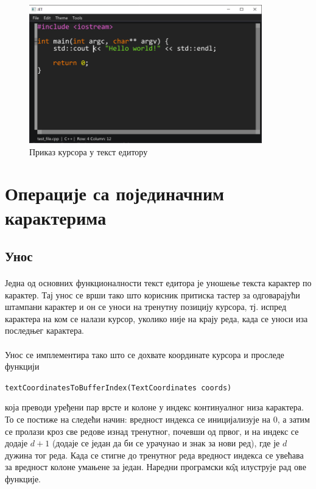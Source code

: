 \documentclass[12pt,oneside]{memoir}
\begin{document}
\begin{figure}[!ht]
	\centering
	\includegraphics[width=0.9\textwidth]{images/cursor.png}
	\caption{Приказ курсора у текст едитору}
	\label{fig:cursor}
\end{figure}

\section{Операције са појединачним карактерима}

\subsection{Унос}
\paragraph{}
Једна од основних функционалности текст едитора је уношење текста карактер
по карактер. Тај унос се врши тако што корисник притиска тастер за одговарајући
штампани карактер и он се уноси на тренутну позицију курсора, тј. испред карактера на ком се налази курсор, уколико није на крају реда, када се уноси иза последњег карактера. 

\paragraph{}
Унос се имплементира тако што се дохвате координате курсора и проследе функцији
\begin{latinica}\verb|textCoordinatesToBufferIndex(TextCoordinates coords)|\end{latinica} 
која преводи уређени пар врсте и колоне у индекс континуалног низа карактера. То се постиже на
следећи начин: вредност индекса се иницијализује на 0, а затим се пролази кроз све редове
изнад тренутног, почевши од првог, и на индекс се додаје \(d+1\) (додаје се један да би се урачунао и знак за нови ред), где је \(d\) дужина тог реда. 
Када се стигне до тренутног реда вредност индекса се увећава за вредност колоне умањене за
један. Наредни програмски к\^{о}д илуструје рад ове функције.
\end{document}
